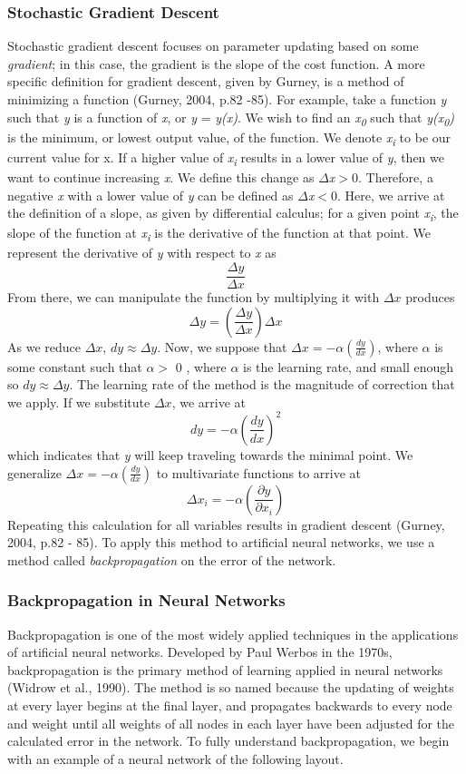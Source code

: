 \documentclass[11pt,titlepage]{article}
\begin{document}
\subsubsection{Stochastic Gradient Descent}\label{sssec:GDD}
Stochastic gradient descent focuses on parameter updating based on some \textit{gradient}; in this case, the gradient is the slope of the cost function. A more specific definition for gradient descent, given by Gurney, is a method of minimizing a function (Gurney, 2004, p.82 -85). For example, take a function \textit{y} such that \textit{y} is a function of \textit{x}, or \textit{y} = \textit{y(x)}. We wish to find an \textit{x\textsubscript{0}} such that \textit{y(x\textsubscript{0})} is the minimum, or lowest output value, of the function. We denote \textit{x\textsubscript{i}} to be our current value for x. If a higher value of \textit{x\textsubscript{i}} results in a lower value of \textit{y}, then we want to continue increasing \textit{x}. We define this change as $\Delta$\textit{x}$>$0. Therefore, a negative \textit{x} with a lower value of \textit{y} can be defined as $\Delta$\textit{x}$<$0. Here, we arrive at the definition of a slope, as given by differential calculus; for a given point \textit{x\textsubscript{i}}, the slope of the function at \textit{x\textsubscript{i}} is the derivative of the function at that point. We represent the derivative of \textit{y} with respect to \textit{x} as $$\frac{\Delta y}{\Delta x}$$ From there, we can manipulate the function by multiplying it with $\Delta x$ produces $$\Delta y = (\frac{\Delta y}{\Delta x})\Delta x$$ As we reduce $\Delta x$, $dy \approx \Delta y$. Now, we suppose that $\Delta x = -\alpha(\frac{dy}{dx}) $, where $\alpha$ is some constant such that $\alpha > $ 0 , where $\alpha$ is the learning rate, and small enough so $dy \approx \Delta y$. The learning rate of the method is the magnitude of correction that we apply. If we substitute $\Delta x$, we arrive at $$ dy = -\alpha(\frac{dy}{dx})^{2}$$ which indicates that \textit{y} will keep traveling towards the minimal point. We generalize $\Delta x = -\alpha(\frac{dy}{dx}) $ to multivariate functions to arrive at $$\Delta x_i = -\alpha(\frac{\partial y}{\partial x_i})$$Repeating this calculation for all variables results in gradient descent (Gurney, 2004, p.82 - 85). To apply this method to artificial neural networks, we use a method called \textit{backpropagation} on the error of the network.

\subsubsection{Backpropagation in Neural Networks}
Backpropagation is one of the most widely applied techniques in the applications of artificial neural networks. Developed by Paul Werbos in the 1970s, backpropagation is the primary method of learning applied in neural networks (Widrow et al., 1990). The method is so named because the updating of weights at every layer begins at the final layer, and propagates backwards to every node and weight until all weights of all nodes in each layer have been adjusted for the calculated error in the network. To fully understand backpropagation, we begin with an example of a neural network of the following layout.
\end{document}
